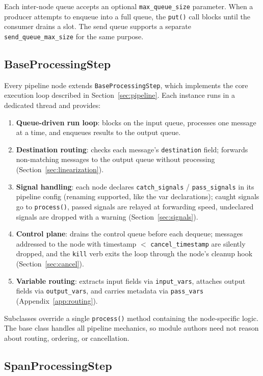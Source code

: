 \documentclass[11pt,a4paper]{article}
\begin{document}
Each inter-node queue accepts an optional \texttt{max\_queue\_size} parameter. When a producer attempts to enqueue into a full queue, the \texttt{put()} call blocks until the consumer drains a slot. The send queue supports a separate \texttt{send\_queue\_max\_size} for the same purpose.

\subsection{BaseProcessingStep}

Every pipeline node extends \texttt{BaseProcessingStep}, which implements the core execution loop described in Section~\ref{sec:pipeline}. Each instance runs in a dedicated thread and provides:

\begin{enumerate}[nosep]
    \item \textbf{Queue-driven run loop}: blocks on the input queue, processes one message at a time, and enqueues results to the output queue.
    \item \textbf{Destination routing}: checks each message's \texttt{destination} field; forwards non-matching messages to the output queue without processing (Section~\ref{sec:linearization}).
    \item \textbf{Signal handling}: each node declares \texttt{catch\_signals} / \texttt{pass\_signals} in its pipeline config (renaming supported, like the var declarations); caught signals go to \texttt{process()}, passed signals are relayed at forwarding speed, undeclared signals are dropped with a warning (Section~\ref{sec:signals}).
    \item \textbf{Control plane}: drains the control queue before each dequeue; messages addressed to the node with timestamp $<$ \texttt{cancel\_timestamp} are silently dropped, and the \texttt{kill} verb exits the loop through the node's cleanup hook (Section~\ref{sec:cancel}).
    \item \textbf{Variable routing}: extracts input fields via \texttt{input\_vars}, attaches output fields via \texttt{output\_vars}, and carries metadata via \texttt{pass\_vars} (Appendix~\ref{app:routing}).
\end{enumerate}

Subclasses override a single \texttt{process()} method containing the node-specific logic. The base class handles all pipeline mechanics, so module authors need not reason about routing, ordering, or cancellation.

\subsection{SpanProcessingStep}
\end{document}
